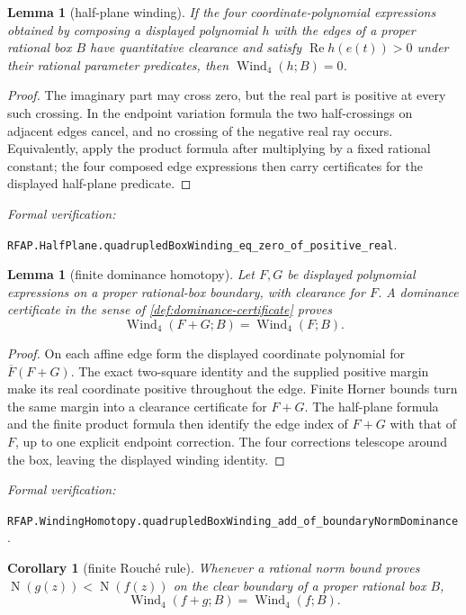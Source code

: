 \documentclass[11pt]{article}
\newtheorem{lemma}[theorem]{Lemma}
\newtheorem{corollary}[theorem]{Corollary}
\newcommand{\Norm}[1]{\operatorname{N}\!\left(#1\right)}
\newcommand{\Ree}{\operatorname{Re}}
\newcommand{\Wind}{\operatorname{Wind}}
\newcommand{\leanref}[1]{\par\smallskip\noindent
  \emph{Formal verification:}\par\nobreak
  {\raggedright\nolinkurl{#1}.\par}}
\begin{document}
\begin{lemma}[half-plane winding]
\label{lem:half-plane}
If the four coordinate-polynomial expressions obtained by composing a
displayed polynomial $h$ with the edges of a proper rational box $B$ have
quantitative clearance and satisfy $\Ree h(e(t))>0$ under their rational
parameter predicates, then $\Wind_4(h;B)=0$.
\end{lemma}

\begin{proof}
The imaginary part may cross zero, but the real part is positive at every such crossing.  In the endpoint variation formula the two half-crossings on adjacent edges cancel, and no crossing of the negative real ray occurs.  Equivalently, apply the product formula after multiplying by a fixed rational constant; the four composed edge expressions then carry certificates for the displayed half-plane predicate.
\end{proof}

\leanref{RFAP.HalfPlane.quadrupledBoxWinding_eq_zero_of_positive_real}

\begin{lemma}[finite dominance homotopy]
\label{lem:dominance-homotopy}
Let $F,G$ be displayed polynomial expressions on a proper rational-box
boundary, with clearance for $F$.  A dominance certificate in the sense of
\cref{def:dominance-certificate} proves
\[
       \Wind_4(F+G;B)=\Wind_4(F;B).
\]
\end{lemma}

\begin{proof}
On each affine edge form the displayed coordinate polynomial for
$\overline F(F+G)$.  The exact two-square identity and the supplied positive
margin make its real coordinate positive throughout the edge.  Finite Horner
bounds turn the same margin into a clearance certificate for $F+G$.
The half-plane formula and the finite product formula then identify the edge
index of $F+G$ with that of $F$, up to one explicit endpoint correction.
The four corrections telescope around the box, leaving the displayed winding
identity.
\end{proof}

\leanref{RFAP.WindingHomotopy.quadrupledBoxWinding_add_of_boundaryNormDominance}

\begin{corollary}[finite Rouché rule]
\label{cor:rouche}
Whenever a rational norm bound proves $\Norm{g(z)}<\Norm{f(z)}$ on the clear
boundary of a proper rational box $B$,
\[
        \Wind_4(f+g;B)=\Wind_4(f;B).
\]
\end{corollary}
\end{document}

